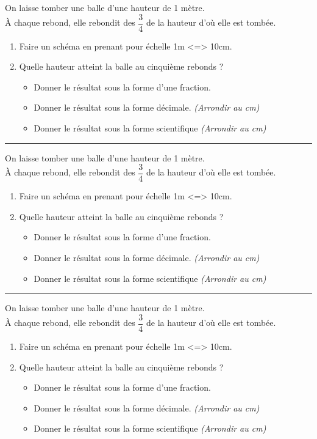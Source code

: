 \documentclass[11pt]{article}
\newcommand{\horrule}[1]{\rule{\linewidth}{#1}} %
\begin{document}
On laisse tomber une balle d'une hauteur de 1 mètre.\\
À chaque rebond, elle rebondit des $\dfrac{3}{4}$ de la hauteur d'où elle est tombée.\\
\begin{enumerate}
\item Faire un schéma en prenant pour échelle 1m <=> 10cm.
\item Quelle hauteur atteint la balle au cinquième rebonds ?
  \begin{itemize}
  \item Donner le résultat sous la forme d'une fraction.
  \item Donner le résultat sous la forme décimale. \textit{(Arrondir au cm)}
  \item Donner le résultat sous la forme scientifique \textit{(Arrondir au cm)}
  \end{itemize}
\end{enumerate}

\horrule{1px}
\vspace{0.3cm}

On laisse tomber une balle d'une hauteur de 1 mètre.\\
À chaque rebond, elle rebondit des $\dfrac{3}{4}$ de la hauteur d'où elle est tombée.\\
\begin{enumerate}
\item Faire un schéma en prenant pour échelle 1m <=> 10cm.
\item Quelle hauteur atteint la balle au cinquième rebonds ?
  \begin{itemize}
  \item Donner le résultat sous la forme d'une fraction.
  \item Donner le résultat sous la forme décimale. \textit{(Arrondir au cm)}
  \item Donner le résultat sous la forme scientifique \textit{(Arrondir au cm)}
  \end{itemize}
\end{enumerate}

\horrule{1px}
\vspace{0.3cm}

On laisse tomber une balle d'une hauteur de 1 mètre.\\
À chaque rebond, elle rebondit des $\dfrac{3}{4}$ de la hauteur d'où elle est tombée.\\
\begin{enumerate}
\item Faire un schéma en prenant pour échelle 1m <=> 10cm.
\item Quelle hauteur atteint la balle au cinquième rebonds ?
  \begin{itemize}
  \item Donner le résultat sous la forme d'une fraction.
  \item Donner le résultat sous la forme décimale. \textit{(Arrondir au cm)}
  \item Donner le résultat sous la forme scientifique \textit{(Arrondir au cm)}
  \end{itemize}
\end{enumerate}
\end{document}
